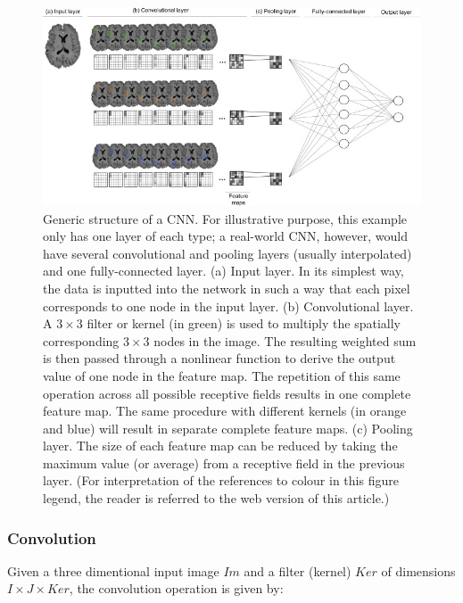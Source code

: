 \documentclass[final, paper=letter,5p,times,twocolumn]{elsarticle}
\begin{document}
\begin{figure}[htbp]
   \begin{center}
      \includegraphics[scale=1., angle=0]{images/1-s2_0-S0149763416305176-gr4.jpg}
   \end{center}
   \caption{Generic structure of a CNN. For illustrative purpose, this example only has one layer of each type; a real-world CNN, however, would have several convolutional and pooling layers (usually interpolated) and one fully-connected layer. (a) Input layer. In its simplest way, the data is inputted into the network in such a way that each pixel corresponds to one node in the input layer. (b) Convolutional layer. A $3 \times 3$ filter or kernel (in green) is used to multiply the spatially corresponding $3 \times 3$ nodes in the image. The resulting weighted sum is then passed through a nonlinear function to derive the output value of one node in the feature map. The repetition of this same operation across all possible receptive fields results in one complete feature map. The same procedure with different kernels (in orange and blue) will result in separate complete feature maps. (c) Pooling layer. The size of each feature map can be reduced by taking the maximum value (or average) from a receptive field in the previous layer. (For interpretation of the references to colour in this figure legend, the reader is referred to the web version of this article.)}
  \label{fig:fitures_maps} 
\end{figure}

\subsubsection{Convolution}

Given a three dimentional input image $Im$ and a filter (kernel) $Ker$ of dimensions $I \times J \times Ker$, the convolution operation is given by:
\end{document}
